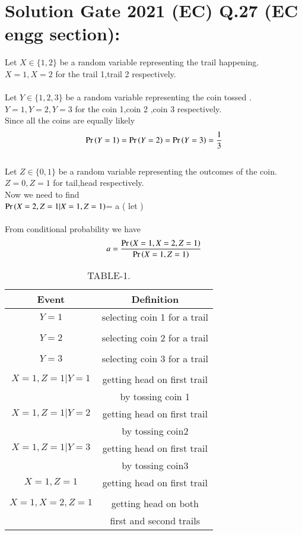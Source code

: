 \documentclass[journal,12pt,twocolumn]{IEEEtran}
\begin{document}
\section*{Solution Gate 2021 (EC) Q.27 (EC engg section):}
Let $X \in \{1,2\}$ be a random variable representing the trail happening.$X=1,X=2$ for  the trail 1,trail 2 respectively.\\
\\Let  $Y \in \{1,2,3\}$ be a random variable representing the coin tossed .$Y=1,Y=2,Y=3$ for the coin 1,coin 2 ,coin 3 respectively.
\\Since all the coins are equally likely
\begin{align}
    \Pr\left(Y=1\right)=\Pr\left(Y=2\right)=\Pr\left(Y=3\right)=\frac{1}{3}
\end{align}
\\Let $Z \in \{0,1\}$ be a random variable representing the outcomes of the coin.$Z=0,Z=1$ for tail,head respectively.\\
Now we need to find\\ $\Pr\left(X=2,Z=1|X=1,Z=1\right)$= a ( let )\\
\\From conditional probability we have
\begin{align}
    a=\frac{\Pr\left(X=1,X=2,Z=1\right)}{\Pr\left(X=1,Z=1\right)}
\end{align}
\begin{table}[h!]
    \resizebox{10cm}{!}
    {
    \begin{tabular}{|c|c|}
    \hline
        Event & Definition \\
         \hline
         $Y=1$ & selecting coin 1 for a trail\\&\\
         \hline
         $Y=2$ & selecting coin 2 for a trail\\&\\
         \hline
         $Y=3$ & selecting coin 3 for a trail\\&\\
         \hline
         $X=1,Z=1|Y=1$ & getting head on first trail
         \\ & by tossing coin 1\\
         \hline
         $X=1,Z=1|Y=2$ & getting head on first trail
         \\ & by tossing coin2 \\
         \hline
         $X=1,Z=1|Y=3$ & getting head on first trail
         \\ & by tossing coin3 \\
         \hline
         $X=1,Z=1$ & getting head on first trail\\&\\
         \hline
         $X=1,X=2,Z=1$ & getting head on both \\ &first and second trails\\
         \hline
    \end{tabular}
    }
    \caption{\label{tab:table-1}TABLE-1.}
\end{table}
\end{document}
